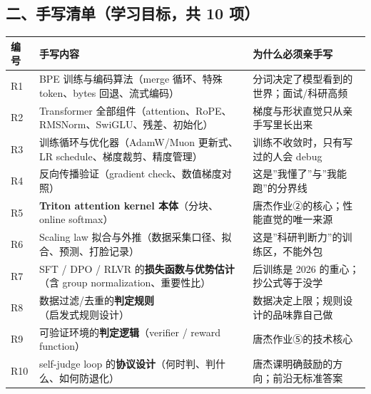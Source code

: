 \documentclass[
  chinese,
  11pt,
]{ctexart}
\newcounter{none} %
\begin{document}
\subsection{二、手写清单（学习目标，共 10 项）}\label{ux4e8cux624bux5199ux6e05ux5355ux5b66ux4e60ux76eeux6807ux5171-10-ux9879}

{\def\LTcaptype{none} %
\begin{longtable}[]{@{}
  >{\raggedright\arraybackslash}p{}
  >{\raggedright\arraybackslash}p{}
  >{\raggedright\arraybackslash}p{}@{}}
\toprule\noalign{}
\begin{minipage}[b]{\linewidth}\raggedright
编号
\end{minipage} & \begin{minipage}[b]{\linewidth}\raggedright
手写内容
\end{minipage} & \begin{minipage}[b]{\linewidth}\raggedright
为什么必须亲手写
\end{minipage} \\
\midrule\noalign{}
\endhead
\bottomrule\noalign{}
\endlastfoot
R1 & BPE 训练与编码算法（merge 循环、特殊 token、bytes 回退、流式编码） & 分词决定了模型看到的世界；面试/科研高频 \\
R2 & Transformer 全部组件（attention、RoPE、RMSNorm、SwiGLU、残差、初始化） & 梯度与形状直觉只从亲手写里长出来 \\
R3 & 训练循环与优化器（AdamW/Muon 更新式、LR schedule、梯度裁剪、精度管理） & 训练不收敛时，只有写过的人会 debug \\
R4 & 反向传播验证（gradient check、数值梯度对照） & 这是''我懂了''与''我能跑''的分界线 \\
R5 & \textbf{Triton attention kernel 本体}（分块、online softmax） & 唐杰作业②的核心；性能直觉的唯一来源 \\
R6 & Scaling law 拟合与外推（数据采集口径、拟合、预测、打脸记录） & 这是''科研判断力''的训练区，不能外包 \\
R7 & SFT / DPO / RLVR 的\textbf{损失函数与优势估计}（含 group normalization、重要性比） & 后训练是 2026 的重心；抄公式等于没学 \\
R8 & 数据过滤/去重的\textbf{判定规则}（启发式规则设计） & 数据决定上限；规则设计的品味靠自己做 \\
R9 & 可验证环境的\textbf{判定逻辑}（verifier / reward function） & 唐杰作业⑤的技术核心 \\
R10 & self-judge loop 的\textbf{协议设计}（何时判、判什么、如何防退化） & 唐杰课明确鼓励的方向；前沿无标准答案 \\
\end{longtable}
}
\end{document}
